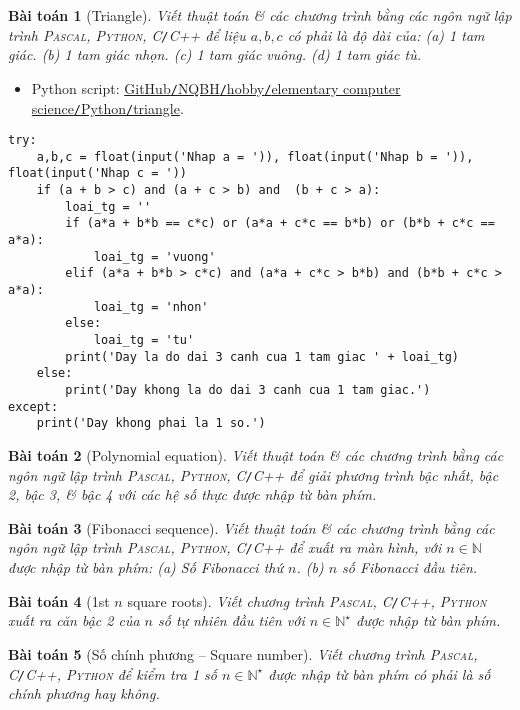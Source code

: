 \documentclass{article}
\newtheorem{baitoan}{Bài toán}
\begin{document}
\begin{baitoan}[Triangle]
	Viết thuật toán \& các chương trình bằng các ngôn ngữ lập trình \textsc{Pascal, Python, C\texttt{/}C++} để liệu $a,b,c$ có phải là độ dài của: (a) 1 tam giác. (b) 1 tam giác nhọn. (c) 1 tam giác vuông. (d) 1 tam giác tù.
\end{baitoan}

\begin{itemize}
	\item Python script: \href{https://github.com/NQBH/hobby/blob/master/elementary_computer_science/Python/triangle.py}{GitHub\texttt{/}NQBH\texttt{/}hobby\texttt{/}elementary computer science\texttt{/}Python\texttt{/}triangle}.
\end{itemize}

\begin{verbatim}
try:
    a,b,c = float(input('Nhap a = ')), float(input('Nhap b = ')), float(input('Nhap c = '))
	if (a + b > c) and (a + c > b) and  (b + c > a):
		loai_tg = ''
		if (a*a + b*b == c*c) or (a*a + c*c == b*b) or (b*b + c*c == a*a):
			loai_tg = 'vuong'
		elif (a*a + b*b > c*c) and (a*a + c*c > b*b) and (b*b + c*c > a*a):
			loai_tg = 'nhon'
		else:
			loai_tg = 'tu'
		print('Day la do dai 3 canh cua 1 tam giac ' + loai_tg)
	else: 
		print('Day khong la do dai 3 canh cua 1 tam giac.')			
except:
	print('Day khong phai la 1 so.')
\end{verbatim}

\begin{baitoan}[Polynomial equation]
	Viết thuật toán \& các chương trình bằng các ngôn ngữ lập trình \textsc{Pascal, Python, C\texttt{/}C++} để giải phương trình bậc nhất, bậc 2, bậc 3, \& bậc 4 với các hệ số thực được nhập từ bàn phím.
\end{baitoan}

\begin{baitoan}[Fibonacci sequence]
	Viết thuật toán \& các chương trình bằng các ngôn ngữ lập trình \textsc{Pascal, Python, C\texttt{/}C++} để xuất ra màn hình, với $n\in\mathbb{N}$ được nhập từ bàn phím: (a) Số Fibonacci thứ $n$. (b) $n$ số Fibonacci đầu tiên.
\end{baitoan}

\begin{baitoan}[1st $n$ square roots]
	Viết chương trình \textsc{Pascal, C\texttt{/}C++, Python} xuất ra căn bậc 2 của $n$ số tự nhiên đầu tiên với $n\in\mathbb{N}^\star$ được nhập từ bàn phím.
\end{baitoan}

\begin{baitoan}[Số chính phương -- Square number]
	Viết chương trình \textsc{Pascal, C\texttt{/}C++, Python} để kiểm tra 1 số $n\in\mathbb{N}^\star$ được nhập từ bàn phím có phải là số chính phương hay không.
\end{baitoan}
\end{document}
